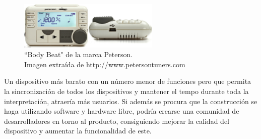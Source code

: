 \begin{figure}[htb]
\centering
\captionsetup{justification=centering}
\includegraphics[width=0.6\textwidth]{./imagenes/bodybeat}
\caption{``Body Beat" de la marca Peterson.\\
\scriptsize{Imagen extraída de http://www.petersontuners.com} \label{fig:bodybeat}}
\end{figure}

Un dispositivo más barato con un número menor de funciones pero que permita la sincronización de todos
los dispositivos y mantener el tempo durante toda la interpretación, atraería más usuarios. Si además
se procura que la construcción se haga utilizando software y hardware libre, podría crearse una comunidad
de desarrolladores en torno al producto, consiguiendo mejorar la calidad del dispositivo y aumentar la funcionalidad
de este.\\
